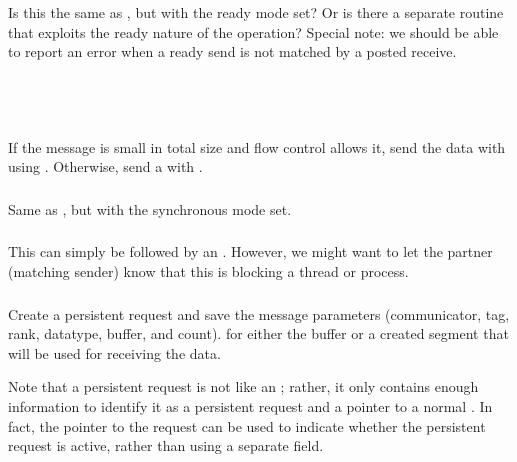 \documentclass{article}
\begin{document}
\subsubsection{}
Is this the same as , but with the ready mode set?  Or is
there a separate routine that exploits the ready nature of the operation?
Special note: we should be able to report an error when a ready send is not
matched by a posted receive.

\subsubsection{}
\begin{adi3}
\begin{mmadi}\\
\\
\begin{core}
If the message is small in total size and flow control allows it, send
the data with  using .
Otherwise, send a  with
. 
\end{core}
\end{mmadi}
\end{adi3}

\subsubsection{}
Same as , but with the synchronous mode set.

\subsubsection{}
This can simply be  followed by an .  However,
we might want to let the partner (matching sender) know that this is blocking
a thread or process.  

\subsubsection{}
\begin{adi3}Create a persistent request and save the message
parameters (communicator, tag, rank, datatype, buffer, and count).
 for either the buffer or a created segment
that will be used for receiving the data.  

Note that a persistent request is not like an
; rather, it only contains enough information
to identify it as a persistent request and a pointer to a normal
.  In fact, the pointer to the request can be
used to indicate whether the persistent request is active, rather than
using a separate field.
\end{adi3}
\end{document}
